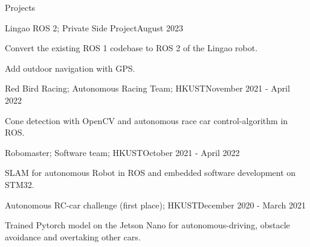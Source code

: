 \documentclass[
	a4paper, %
	11pt, %
]{resume} %
\begin{document}
\begin{rSection}{Projects}

	\begin{rSubsection}{Lingao ROS 2; Private Side Project}{August 2023}{}{}
		\item Convert the existing ROS 1 codebase to ROS 2 of the Lingao robot.
		\item Add outdoor navigation with GPS.
	\end{rSubsection}


	\begin{rSubsection}{Red Bird Racing; Autonomous Racing Team; HKUST}{November 2021 - April 2022}{}{}
		\item Cone detection with OpenCV and autonomous race car control-algorithm in ROS.
	\end{rSubsection}


	\begin{rSubsection}{Robomaster; Software team; HKUST}{October 2021 - April 2022}{}{}
		\item SLAM for autonomous Robot in ROS and embedded software development on STM32.
	\end{rSubsection}


	\begin{rSubsection}{Autonomous RC-car challenge (first place); HKUST}{December 2020 - March 2021}{}{}
		\item Trained Pytorch model on the Jetson Nano for autonomous-driving, obstacle avoidance and overtaking other cars.
	\end{rSubsection}

\end{rSection}






\end{document}
